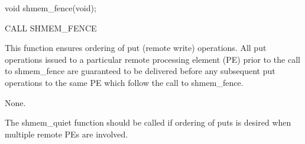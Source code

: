 \synC   %
 
 void shmem_fence(void);

\synF   %

 CALL SHMEM_FENCE

{
    This  function ensures ordering of put (remote write) operations. All
    put operations issued to a particular remote  processing element (PE)
    prior  to the call to shmem\_fence are guaranteed to be delivered before
    any subsequent put operations to the same PE which follow the  call  to
    shmem\_fence.
}

{
    {None.}
}


{
    The  shmem\_quiet	 function  should  be  called  if  ordering of puts is
    desired when multiple remote PEs are involved.
}
\eAPI


